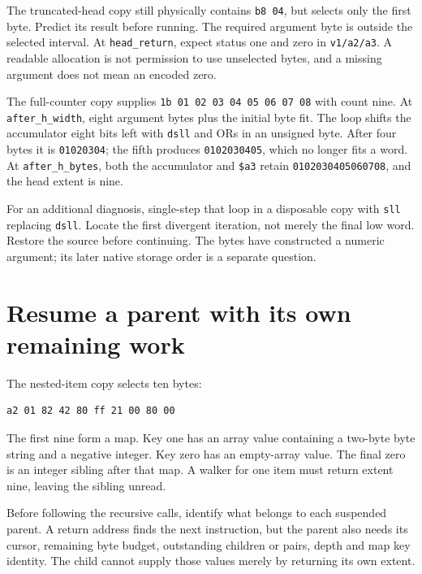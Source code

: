 The truncated-head copy still physically contains \texttt{b8 04}, but selects
only the first byte. Predict its result before running. The required argument
byte is outside the selected interval. At \texttt{head\_return}, expect status
one and zero in \texttt{v1/a2/a3}. A readable allocation is not permission to
use unselected bytes, and a missing argument does not mean an encoded zero.

The full-counter copy supplies \texttt{1b 01 02 03 04 05 06 07 08} with count
nine. At \texttt{after\_h\_width}, eight argument bytes plus the initial byte
fit. The loop shifts the accumulator eight bits left with \texttt{dsll} and ORs
in an unsigned byte. After four bytes it is \texttt{01020304}; the fifth produces
\texttt{0102030405}, which no longer fits a word. At
\texttt{after\_h\_bytes}, both the accumulator and \texttt{\$a3} retain
\texttt{0102030405060708}, and the head extent is nine.

For an additional diagnosis, single-step that loop in a disposable copy with
\texttt{sll} replacing \texttt{dsll}. Locate the first divergent iteration,
not merely the final low word. Restore the source before continuing. The bytes
have constructed a numeric argument; its later native storage order is a separate
question.

\section{Resume a parent with its own remaining work}

The nested-item copy selects ten bytes:
\begin{verbatim}
a2 01 82 42 80 ff 21 00 80 00
\end{verbatim}
The first nine form a map. Key one has an array value containing a two-byte byte
string and a negative integer. Key zero has an empty-array value. The final zero
is an integer sibling after that map. A walker for one item must return extent
nine, leaving the sibling unread.

Before following the recursive calls, identify what belongs to each suspended
parent. A return address finds the next instruction, but the parent also needs
its cursor, remaining byte budget, outstanding children or pairs, depth and map
key identity. The child cannot supply those values merely by returning its own
extent.


